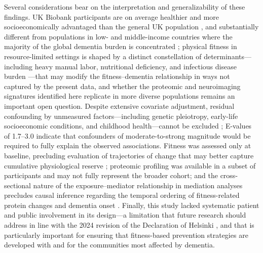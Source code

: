 \documentclass{article}
\begin{document}
Several considerations bear on the interpretation and generalizability 
of these findings.
UK Biobank participants are on average healthier and more socioeconomically 
advantaged than the general UK population \citep{fry2017comparison}, and 
substantially different from populations in low- and middle-income 
countries where the majority of the global dementia burden is 
concentrated \citep{nichols2022global}; physical fitness in 
resource-limited settings is shaped by a distinct constellation of 
determinants—including heavy manual labor, nutritional deficiency, and 
infectious disease burden \citep{wolters2020lifestyle}—that may modify 
the fitness--dementia relationship in ways not captured by the present 
data, and whether the proteomic and neuroimaging signatures identified 
here replicate in more diverse populations remains an important open 
question.
Despite extensive covariate adjustment, residual confounding by unmeasured 
factors—including genetic pleiotropy, early-life socioeconomic conditions, 
and childhood health—cannot be excluded \citep{davey2003mendelian}; 
E-values of 1.7--3.0 indicate that confounders of moderate-to-strong 
magnitude would be required to fully explain the observed associations.
Fitness was assessed only at baseline, precluding evaluation of 
trajectories of change that may better capture cumulative physiological 
reserve \citep{clouston2013trajectories}; proteomic profiling was 
available in a subset of participants and may not fully represent the 
broader cohort; and the cross-sectional nature of the exposure--mediator 
relationship in mediation analyses precludes causal inference regarding 
the temporal ordering of fitness-related protein changes and dementia 
onset \citep{tingley2014mediation}.
Finally, this study lacked systematic patient and public involvement 
in its design—a limitation that future research should address in line 
with the 2024 revision of the Declaration of Helsinki 
\citep{bibbins20252024}, and that is particularly important for ensuring 
that fitness-based prevention strategies are developed with and for the 
communities most affected by dementia.
\end{document}
